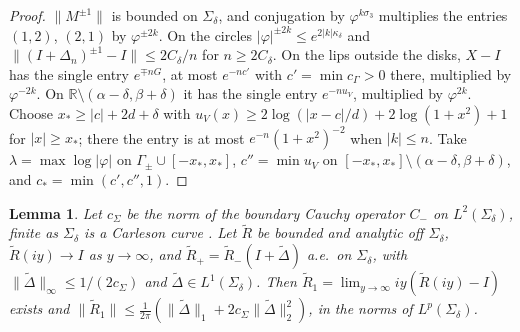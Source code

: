 \documentclass[11pt]{amsart}
\newtheorem{lemma}[theorem]{Lemma}
\theoremstyle{definition}
\theoremstyle{remark}
\numberwithin{equation}{section}
\newcommand{\R}{\mathbb{R}}
\begin{document}
\begin{proof}
$\|M^{\pm1}\|$ is bounded on $\Sigma_\delta$, and conjugation by $\varphi^{k\sigma_3}$ multiplies the entries $(1,2)$, $(2,1)$ by $\varphi^{\pm2k}$. On the circles $|\varphi|^{\pm2k}\le e^{2|k|\kappa_\delta}$ and $\|(I+\Delta_n)^{\pm1}-I\|\le2C_\delta/n$ for $n\ge2C_\delta$. On the lips outside the disks, $X-I$ has the single entry $e^{\mp nG}$, at most $e^{-nc'}$ with $c'=\min c_\Gamma>0$ there, multiplied by $\varphi^{-2k}$. On $\R\setminus(\alpha-\delta,\beta+\delta)$ it has the single entry $e^{-nu_V}$, multiplied by $\varphi^{2k}$. Choose $x_*\ge|c|+2d+\delta$ with $u_V(x)\ge2\log(|x-c|/d)+2\log(1+x^2)+1$ for $|x|\ge x_*$; there the entry is at most $e^{-n}(1+x^2)^{-2}$ when $|k|\le n$. Take $\lambda=\max\log|\varphi|$ on $\Gamma_\pm\cup[-x_*,x_*]$, $c''=\min u_V$ on $[-x_*,x_*]\setminus(\alpha-\delta,\beta+\delta)$, and $c_*=\min(c',c'',1)$.
\end{proof}

\begin{lemma}\label{lem:rc-smallnorm}
Let $c_\Sigma$ be the norm of the boundary Cauchy operator $C_-$ on $L^2(\Sigma_\delta)$, finite as $\Sigma_\delta$ is a Carleson curve \cite[Theorem~2.1]{Le}. Let $\widetilde R$ be bounded and analytic off $\Sigma_\delta$, $\widetilde R(iy)\to I$ as $y\to\infty$, and $\widetilde R_+=\widetilde R_-(I+\widetilde\Delta)$ a.e.\ on $\Sigma_\delta$, with $\|\widetilde\Delta\|_\infty\le1/(2c_\Sigma)$ and $\widetilde\Delta\in L^1(\Sigma_\delta)$. Then $\widetilde R_1=\lim_{y\to\infty}iy(\widetilde R(iy)-I)$ exists and $\|\widetilde R_1\|\le\frac1{2\pi}(\|\widetilde\Delta\|_{1}+2c_\Sigma\|\widetilde\Delta\|_{2}^2)$, in the norms of $L^p(\Sigma_\delta)$.
\end{lemma}
\end{document}
